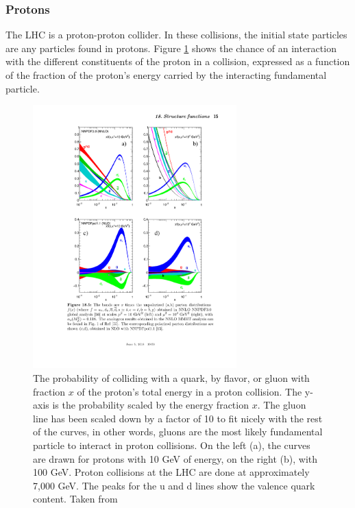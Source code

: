   \subsubsection{Protons}
    The LHC is a proton-proton collider. In these collisions, the initial state particles are any particles found in protons. Figure \ref{fig:proton_pdf} shows the chance of an interaction with the different constituents of the proton in a collision, expressed as a function of the fraction of the proton's energy carried by the interacting fundamental particle.

    \begin{figure}[h!]
      \centering
      \includegraphics[width=0.7\textwidth]{figures/proton_pdf.pdf}
      \caption{The probability of colliding with a quark, by flavor, or gluon with fraction $x$ of the proton's total energy in a proton collision. The y-axis is the probability scaled by the energy fraction $x$. The gluon line has been scaled down by a factor of 10 to fit nicely with the rest of the curves, in other words, gluons are the most likely fundamental particle to interact in proton collisions. On the left (a), the curves are drawn for protons with 10 GeV of energy, on the right (b), with 100 GeV. Proton collisions at the LHC are done at approximately 7,000 GeV. The peaks for the u and d lines show the valence quark content. Taken from \cite[sec. ``Structure Functions"]{PDG}}
      \label{fig:proton_pdf}
    \end{figure}  

